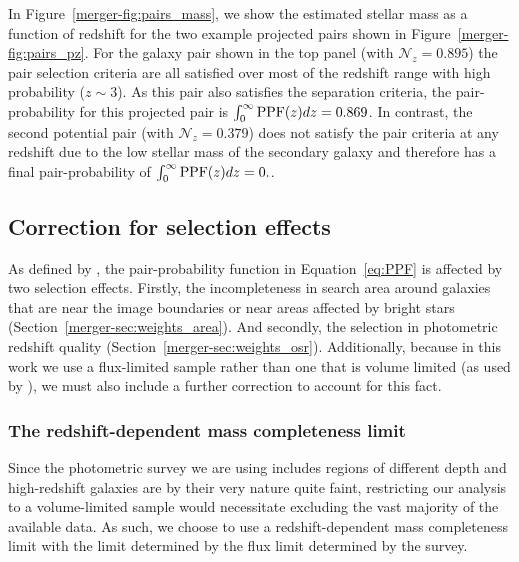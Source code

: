 In Figure~\ref{merger-fig:pairs_mass}, we show the estimated stellar mass as a function of redshift for the two example projected pairs shown in Figure~\ref{merger-fig:pairs_pz}. For the galaxy pair shown in the top panel (with $\mathcal{N}_{z} = 0.895$) the pair selection criteria are all satisfied over most of the redshift range with high probability ($z\sim3$). As this pair also satisfies the separation criteria, the pair-probability for this projected pair is $\int_{0}^{\infty} \textup{PPF}(z) dz = 0.869$. In contrast, the second potential pair (with $\mathcal{N}_{z} = 0.379$) does not satisfy the pair criteria at any redshift due to the low stellar mass of the secondary galaxy and therefore has a final pair-probability of $\int_{0}^{\infty} \textup{PPF}(z) dz = 0.$.

\subsection{Correction for selection effects}
As defined by , the pair-probability function in Equation~\ref{eq:PPF} is affected by two selection effects. Firstly, the incompleteness in search area around galaxies that are near the image boundaries or near areas affected by bright stars (Section~\ref{merger-sec:weights_area}). And secondly, the selection in photometric redshift quality (Section~\ref{merger-sec:weights_osr}). Additionally, because in this work we use a flux-limited sample rather than one that is volume limited (as used by ), we must also include a further correction to account for this fact.

\subsubsection{The redshift-dependent mass completeness limit}\label{merger-sec:weights_flux}
Since the photometric survey we are using includes regions of different depth and high-redshift galaxies are by their very nature quite faint, restricting our analysis to a volume-limited sample would necessitate excluding the vast majority of the available data. As such, we choose to use a redshift-dependent mass completeness limit with the limit determined by the flux limit determined by the survey. 

